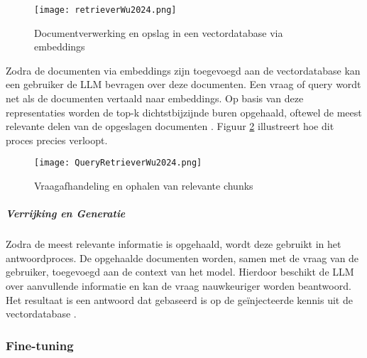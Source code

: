  \begin{figure}[H]
    \centering
    \texttt{[image: retrieverWu2024.png]}
    \caption{Documentverwerking en opslag in een vectordatabase via embeddings \autocite{wu2025retrievalaugmentedgenerationnaturallanguage}}
    \label{fig:RAG opmaken vectordatabase}
\end{figure}

Zodra de documenten via embeddings zijn toegevoegd aan de vectordatabase kan een gebruiker de LLM bevragen over deze documenten. Een vraag of query wordt net als de documenten vertaald naar embeddings. Op basis van deze representaties worden de top-k dichtstbijzijnde buren opgehaald, oftewel de meest relevante delen van de opgeslagen documenten \autocite{wu2025retrievalaugmentedgenerationnaturallanguage}. Figuur \ref{fig:RAG bevragen vectordatabase} illustreert hoe dit proces precies verloopt.
        
\begin{figure}[H]
    \centering
    \texttt{[image: QueryRetrieverWu2024.png]}
    \caption{Vraagafhandeling en ophalen van relevante chunks \autocite{wu2025retrievalaugmentedgenerationnaturallanguage}}
    \label{fig:RAG bevragen vectordatabase}
\end{figure}

\subparagraph{Verrijking en Generatie}

Zodra de meest relevante informatie is opgehaald, wordt deze gebruikt in het antwoordproces. De opgehaalde documenten worden, samen met de vraag van de gebruiker, toegevoegd aan de context van het model. Hierdoor beschikt de LLM over aanvullende informatie en kan de vraag nauwkeuriger worden beantwoord. Het resultaat is een antwoord dat gebaseerd is op de geïnjecteerde kennis uit de vectordatabase \autocite{zhao2024retrievalaugmentedgenerationaigeneratedcontent}.


\subsubsection{Fine-tuning}

